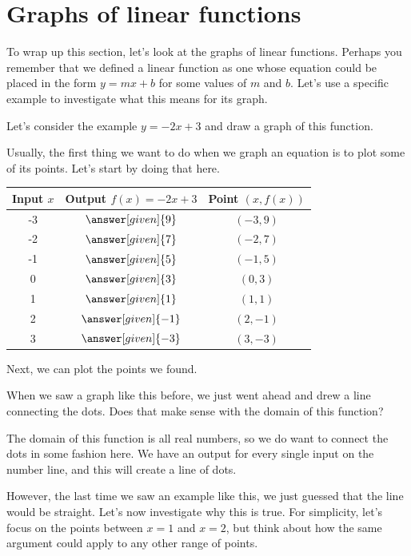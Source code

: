 \documentclass{ximera}
\begin{document}
\section{Graphs of linear functions}
To wrap up this section, let's look at the graphs of linear functions. Perhaps you remember that we defined a linear function as one whose equation could be placed in the form $y=mx+b$ for some values of $m$ and $b$. Let's use a specific example to investigate what this means for its graph.
\begin{example}
Let's consider the example $y = -2x+3$ and draw a graph of this function.

Usually, the first thing we want to do when we graph an equation is to plot some of its points. Let's start by doing that here.
\begin{image}
\begin{tabular}{c|c|c}
Input $x$ & Output $f(x)=-2x+3$ & Point $(x, f(x))$ \\ \hline
-3 & $\answer[given]{9}$ & $(-3, 9)$ \\ \hline
-2 & $\answer[given]{7}$ & $(-2, 7)$ \\ \hline
-1 & $\answer[given]{5}$ & $(-1, 5)$ \\ \hline
0 & $\answer[given]{3}$ & $(0, 3)$ \\ \hline
1 & $\answer[given]{1}$ & $(1, 1)$ \\ \hline
2 & $\answer[given]{-1}$ & $(2, -1)$ \\ \hline
3 & $\answer[given]{-3}$ & $(3, -3)$ \\ \hline
\end{tabular}
\end{image}
Next, we can plot the points we found.
\begin{image}
\end{image}
When we saw a graph like this before, we just went ahead and drew a line connecting the dots. Does that make sense with the domain of this function?
\begin{multipleChoice}
\begin{feedback}[correct]
The domain of this function is all real numbers, so we do want to connect the dots in some fashion here. We have an output for every single input on the number line, and this will create a line of dots.
\end{feedback}
\end{multipleChoice}
However, the last time we saw an example like this, we just guessed that the line would be straight. Let's now investigate why this is true. For simplicity, let's focus on the points between $x=1$ and $x=2$, but think about how the same argument could apply to any other range of points.


\end{example}
\end{document}
